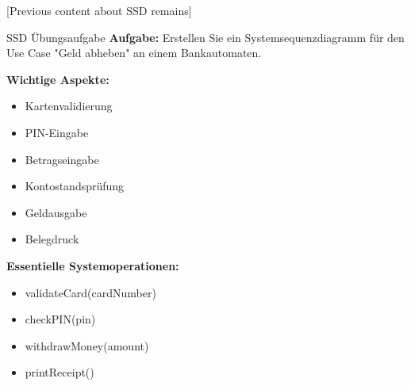 [Previous content about SSD remains]

\begin{example}{SSD Übungsaufgabe}
\textbf{Aufgabe:} Erstellen Sie ein Systemsequenzdiagramm für den Use Case "Geld abheben" an einem Bankautomaten.

\textbf{Wichtige Aspekte:}
\begin{itemize}
    \item Kartenvalidierung
    \item PIN-Eingabe
    \item Betragseingabe
    \item Kontostandsprüfung
    \item Geldausgabe
    \item Belegdruck
\end{itemize}

\textbf{Essentielle Systemoperationen:}
\begin{itemize}
    \item validateCard(cardNumber)
    \item checkPIN(pin)
    \item withdrawMoney(amount)
    \item printReceipt()
\end{itemize}
\end{example}